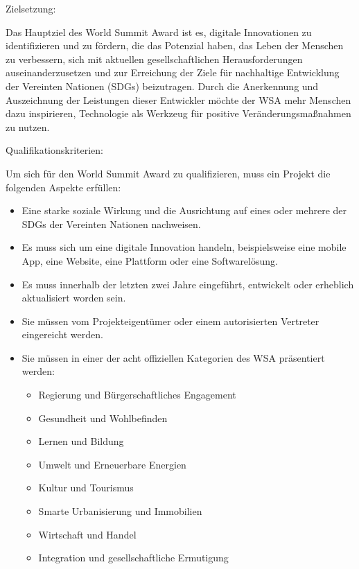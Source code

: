 Zielsetzung:

Das Hauptziel des World Summit Award ist es, digitale Innovationen zu identifizieren und zu fördern, die das Potenzial haben, das Leben der Menschen zu verbessern, sich mit aktuellen gesellschaftlichen Herausforderungen auseinanderzusetzen und zur Erreichung der Ziele für nachhaltige Entwicklung der Vereinten Nationen (SDGs) beizutragen. Durch die Anerkennung und Auszeichnung der Leistungen dieser Entwickler möchte der WSA mehr Menschen dazu inspirieren, Technologie als Werkzeug für positive Veränderungsmaßnahmen zu nutzen.

Qualifikationskriterien:

Um sich für den World Summit Award zu qualifizieren, muss ein Projekt die folgenden Aspekte erfüllen:

\begin{itemize}
    \item {Eine starke soziale Wirkung und die Ausrichtung auf eines oder mehrere der SDGs der Vereinten Nationen nachweisen.}
    \item {Es muss sich um eine digitale Innovation handeln, beispielsweise eine mobile App, eine Website, eine Plattform oder eine Softwarelösung.}
    \item {Es muss innerhalb der letzten zwei Jahre eingeführt, entwickelt oder erheblich aktualisiert worden sein.}
    \item {Sie müssen vom Projekteigentümer oder einem autorisierten Vertreter eingereicht werden.}
    \item {Sie müssen in einer der acht offiziellen Kategorien des WSA präsentiert werden:}
          \begin{itemize}
              \item {Regierung und Bürgerschaftliches Engagement}
              \item {Gesundheit und Wohlbefinden}
              \item {Lernen und Bildung}
              \item {Umwelt und Erneuerbare Energien}
              \item {Kultur und Tourismus}
              \item {Smarte Urbanisierung und Immobilien}
              \item {Wirtschaft und Handel}
              \item {Integration und gesellschaftliche Ermutigung}
          \end{itemize}
\end{itemize}

